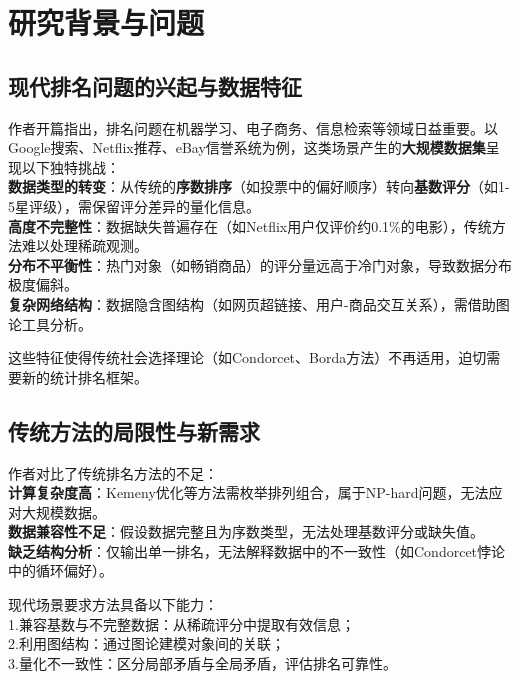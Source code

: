 \documentclass[a4paper]{article}
\begin{document}
\section{研究背景与问题}
\subsection{现代排名问题的兴起与数据特征}
作者开篇指出，排名问题在机器学习、电子商务、信息检索等领域日益重要。以Google搜索、Netflix推荐、eBay信誉系统为例，这类场景产生的\textbf{大规模数据集}呈现以下独特挑战：\\
\indent \textbf{数据类型的转变}：从传统的\textbf{序数排序}（如投票中的偏好顺序）转向\textbf{基数评分}（如1-5星评级），需保留评分差异的量化信息。\\
\indent \textbf{高度不完整性}：数据缺失普遍存在（如Netflix用户仅评价约0.1\%的电影），传统方法难以处理稀疏观测。\\
\indent \textbf{分布不平衡性}：热门对象（如畅销商品）的评分量远高于冷门对象，导致数据分布极度偏斜。\\
\indent \textbf{复杂网络结构}：数据隐含图结构（如网页超链接、用户-商品交互关系），需借助图论工具分析。

这些特征使得传统社会选择理论（如Condorcet、Borda方法）不再适用，迫切需要新的统计排名框架。\cite{Jiang2011StatisticalRanking}

\subsection{传统方法的局限性与新需求}
作者对比了传统排名方法的不足：\\
\indent \textbf{计算复杂度高}：Kemeny优化等方法需枚举排列组合，属于NP-hard问题，无法应对大规模数据。\\
\indent \textbf{数据兼容性不足}：假设数据完整且为序数类型，无法处理基数评分或缺失值。\\
\indent \textbf{缺乏结构分析}：仅输出单一排名，无法解释数据中的不一致性（如Condorcet悖论中的循环偏好）。

现代场景要求方法具备以下能力：\\
\indent 1.兼容基数与不完整数据：从稀疏评分中提取有效信息；\\
\indent 2.利用图结构：通过图论建模对象间的关联；\\
\indent 3.量化不一致性：区分局部矛盾与全局矛盾，评估排名可靠性。
\end{document}
